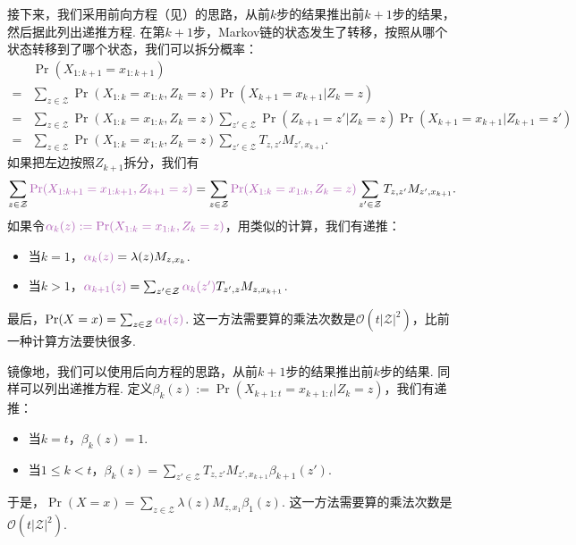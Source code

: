 接下来，我们采用前向方程（见）的思路，从前$k$步的结果推出前$k+1$步的结果，然后据此列出递推方程. 在第$k+1$步，Markov链的状态发生了转移，按照从哪个状态转移到了哪个状态，我们可以拆分概率：
\begin{align*}
      &\Pr(X_{1:k+1}=x_{1:k+1}) \\
    = &\sum_{z\in \mathcal Z}\Pr(X_{1:k}=x_{1:k}, Z_k=z)\Pr(X_{k+1}=x_{k+1}|Z_k=z)\\
    = &\sum_{z\in \mathcal Z}\Pr(X_{1:k}=x_{1:k}, Z_k=z)\sum_{z'\in \mathcal Z}\Pr(Z_{k+1}=z'|Z_k=z)\Pr(X_{k+1}=x_{k+1}|Z_{k+1}=z')\\
    = &\sum_{z\in \mathcal Z}\Pr(X_{1:k}=x_{1:k}, Z_k=z)\sum_{z'\in \mathcal Z}T_{z,z'}M_{z',x_{k+1}}.
\end{align*}
如果把左边按照$Z_{k+1}$拆分，我们有
\[
    \sum_{z\in\mathcal Z}\textcolor{Orchid}{\Pr(X_{1:k+1}=x_{1:k+1}, Z_{k+1}=z)} = \sum_{z\in \mathcal Z}\textcolor{Orchid}{\Pr(X_{1:k}=x_{1:k}, Z_k=z)}\sum_{z'\in \mathcal Z}T_{z,z'}M_{z',x_{k+1}}.
\]
如果令$\textcolor{Orchid}{\alpha_k(z):=\Pr(X_{1:k}=x_{1:k}, Z_k=z)}$，用类似的计算，我们有递推：
\begin{itemize}
    \item 当$k=1$，$\textcolor{Orchid}{\alpha_k(z)} = \lambda(z)M_{z,x_k}$.
    \item 当$k>1$，$\textcolor{Orchid}{\alpha_{k+1}(z)} = \sum_{z' \in \mathcal Z}\textcolor{Orchid}{\alpha_{k}(z')}T_{z',z}M_{z,x_{k+1}}$.
\end{itemize}
最后，$\Pr(X=x) = \sum_{z\in \mathcal Z}\textcolor{Orchid}{\alpha_t(z)}$. 这一方法需要算的乘法次数是$\mathcal O(t|\mathcal Z|^2)$，比前一种计算方法要快很多.

镜像地，我们可以使用后向方程的思路，从前$k+1$步的结果推出前$k$步的结果. 同样可以列出递推方程. 定义$\beta_k(z):=\Pr(X_{k+1:t}=x_{k+1:t} | Z_k=z)$，我们有递推：
\begin{itemize}
    \item 当$k = t$，$\beta_k(z) = 1$.
    \item 当$1 \leq k < t$，$\beta_{k}(z) = \sum_{z' \in \mathcal Z}T_{z,z'}M_{z',x_{k+1}}\beta_{k+1}(z')$.
\end{itemize}
于是，$\Pr(X=x) = \sum_{z\in \mathcal Z}\lambda(z)M_{z,x_1}\beta_1(z)$. 这一方法需要算的乘法次数是$\mathcal O(t|\mathcal Z|^2)$.


